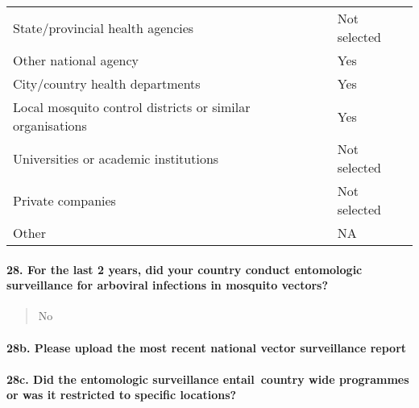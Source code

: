 \documentclass[
]{article}
\begin{document}
\begin{longtable}[]{@{}ll@{}}
\toprule
\endhead
State/provincial health agencies & Not selected \\
Other national agency & Yes \\
City/country health departments & Yes \\
Local mosquito control districts or similar organisations & Yes \\
Universities or academic institutions & Not selected \\
Private companies & Not selected \\
Other & NA \\
\bottomrule
\end{longtable}

\hypertarget{for-the-last-2-years-did-your-country-conduct-entomologic-surveillance-for-arboviral-infections-in-mosquito-vectors}{%
\paragraph{28. For the last 2 years, did your country conduct
entomologic surveillance for arboviral infections in mosquito
vectors?}\label{for-the-last-2-years-did-your-country-conduct-entomologic-surveillance-for-arboviral-infections-in-mosquito-vectors}}

\begin{quote}
No
\end{quote}

\hypertarget{b.-please-upload-the-most-recent-national-vector-surveillance-report}{%
\paragraph{28b. Please upload the most recent national vector
surveillance
report}\label{b.-please-upload-the-most-recent-national-vector-surveillance-report}}

\begin{quote}
\end{quote}

\hypertarget{c.-did-the-entomologic-surveillance-entail-country-wide-programmes-or-was-it-restricted-to-specific-locations}{%
\paragraph{28c. Did the entomologic surveillance entail~country wide
programmes or was it restricted to specific
locations?}\label{c.-did-the-entomologic-surveillance-entail-country-wide-programmes-or-was-it-restricted-to-specific-locations}}
\end{document}
